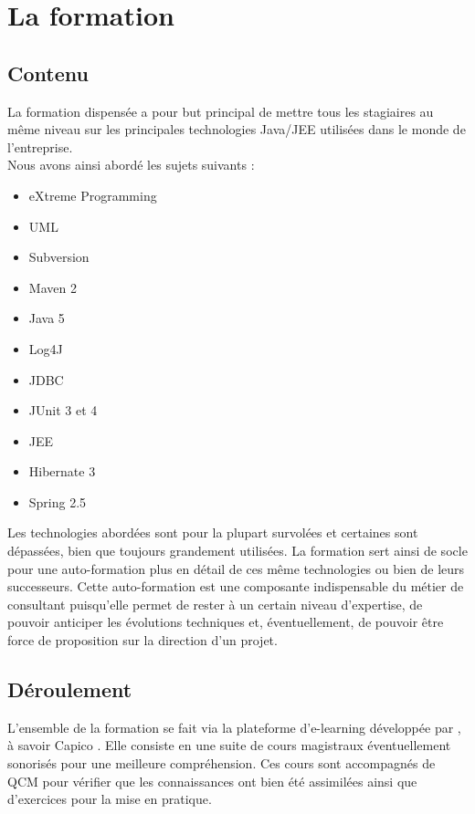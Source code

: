 \section{La formation}

\subsection{Contenu}

La formation dispensée a pour but principal de mettre tous les stagiaires au même niveau sur les principales technologies Java/JEE utilisées dans le monde de l'entreprise.\\

Nous avons ainsi abordé les sujets suivants :

\begin{itemize}
	\item eXtreme Programming
	\item UML
	\item Subversion
	\item Maven 2
	\item Java 5
	\item Log4J
	\item JDBC
	\item JUnit 3 et 4
	\item JEE
	\item Hibernate 3
	\item Spring 2.5\\
\end{itemize}

Les technologies abordées sont pour la plupart survolées et certaines sont dépassées, bien que toujours grandement utilisées. La formation sert ainsi de socle pour une auto-formation plus en détail de ces même technologies ou bien de leurs successeurs. Cette auto-formation est une composante indispensable du métier de consultant puisqu'elle permet de rester à un certain niveau d'expertise, de pouvoir anticiper les évolutions techniques et, éventuellement, de pouvoir être force de proposition sur la direction d'un projet.

\subsection{Déroulement}

L'ensemble de la formation se fait via la plateforme d'e-learning développée par \excilys{}, à savoir Capico \cite{capico}. Elle consiste en une suite de cours magistraux éventuellement sonorisés pour une meilleure compréhension. Ces cours sont accompagnés de QCM pour vérifier que les connaissances ont bien été assimilées ainsi que d'exercices pour la mise en pratique.

